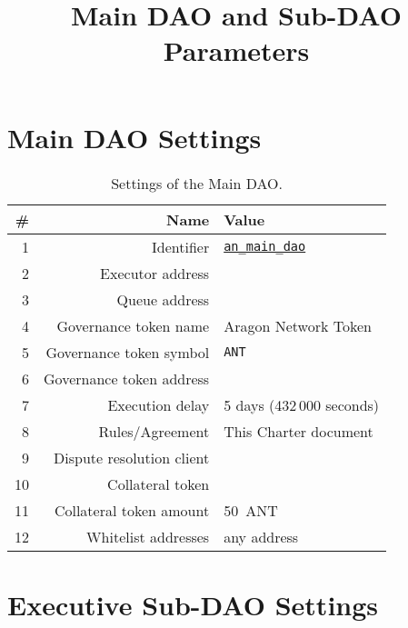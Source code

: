
\title{Main DAO and Sub-DAO Parameters}



\mytitle

\section{Main DAO Settings}

\begin{table}[h!]
	\caption{Settings of the Main DAO.}
	\centering
	\begin{tabular}{rrl}
		\toprule
		\# & Name & Value \\
		\midrule
		 1 & Identifier					& \href{https://govern.aragon.org/\#/daos/an_main_dao}{\texttt{an\_main\_dao}}\\
		 2 & Executor address			& \mainDaoAddr\\
		 3 & Queue address				& \mainDaoQueueAddr\\
		 4 & Governance token name		& Aragon Network Token\\
		 5 & Governance token symbol	& \texttt{\ac{ANT}}\\
		 6 & Governance token address	& \mainDaoTokenAddr\\
		 7 & Execution delay			& 5 days (432\,000 seconds)\\
		 8 & Rules/Agreement			& This Charter document\\
		 9 & Dispute resolution client	& \aragonCourtAddr\\
		10 & Collateral token			& \antTokenAddr\\
		11 & Collateral token amount	& 50~\ac{ANT}\\
		12 & Whitelist addresses 		& any address\\
		\bottomrule
	\end{tabular}
\end{table}
\clearpage

\section{Executive Sub-DAO Settings}

